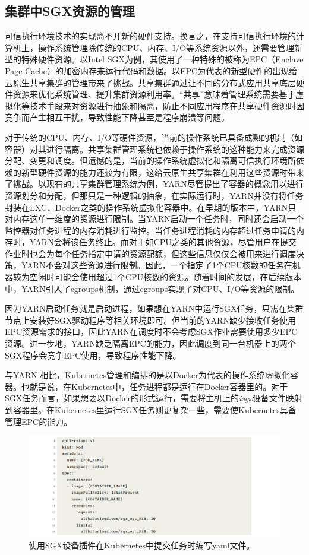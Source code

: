 \subsection{集群中SGX资源的管理}

可信执行环境技术的实现离不开新的硬件支持。换言之，在支持可信执行环境的计算机上，操作系统管理除传统的CPU、内存、I/O等系统资源以外，还需要管理新型的特殊硬件资源。以Intel SGX为例，其使用了一种特殊的被称为EPC（Enclave Page Cache）的加密内存来运行代码和数据。以EPC为代表的新型硬件的出现给云原生共享集群的管理带来了挑战。共享集群通过让不同的分布式应用共享底层硬件资源来优化系统管理、提升集群资源利用率。“共享”意味着管理系统需要基于虚拟化等技术手段来对资源进行抽象和隔离，防止不同应用程序在共享硬件资源时因竞争而产生相互干扰，导致性能下降甚至是程序崩溃等问题。

对于传统的CPU、内存、I/O等硬件资源，当前的操作系统已具备成熟的机制（如容器）对其进行隔离。共享集群管理系统也依赖于操作系统的这种能力来完成资源分配、变更和调度。但遗憾的是，当前的操作系统虚拟化和隔离可信执行环境所依赖的新型硬件资源的能力还较为有限，这给云原生共享集群在利用这些资源时带来了挑战。以现有的共享集群管理系统为例，YARN尽管提出了容器的概念用以进行资源划分和分配，但那只是一种逻辑的抽象，在实际运行时，YARN并没有将任务封装在LXC、Docker之类的操作系统虚拟化容器中。在早期的版本中，YARN只对内存这单一维度的资源进行限制。当YARN启动一个任务时，同时还会启动一个监控器对任务进程的内存消耗进行监控。当任务进程消耗的内存超过任务申请的内存时，YARN会将该任务终止。而对于如CPU之类的其他资源，尽管用户在提交作业时也会为每个任务指定申请的资源配额，但这些信息仅仅会被用来进行调度决策，YARN不会对这些资源进行限制。因此，一个指定了1个CPU核数的任务在机器较为空闲时可能会使用超过1个CPU核数的资源。随着时间的发展，在后续版本中，YARN引入了cgroups机制，通过cgroups实现了对CPU、I/O等资源的限制。

因为YARN启动任务就是启动进程，如果想在YARN中运行SGX任务，只需在集群节点上安装好SGX驱动程序等相关环境即可。但当前的YARN缺少接收任务使用EPC资源需求的接口，因此YARN在调度时不会考虑SGX作业需要使用多少EPC资源。进一步地，YARN缺乏隔离EPC的能力，因此调度到同一台机器上的两个SGX程序会竞争EPC使用，导致程序性能下降。

与YARN 相比，Kubernetes管理和编排的是以Docker为代表的操作系统虚拟化容器。也就是说，在Kubernetes中，任务进程都是运行在Docker容器里的。对于SGX任务而言，如果想要以Docker的形式运行，需要将主机上的\textit{isgx}设备文件映射到容器里。在Kubernetes里运行SGX任务则更复杂一些，需要使Kubernetes具备管理EPC的能力。

\begin{figure}[h]
    \centerline{\includegraphics[width=\textwidth]{figures/k8s-yaml.png}}
    \caption{使用SGX设备插件在Kubernetes中提交任务时编写yaml文件。}
    \label{k8s_yaml}
\end{figure}

